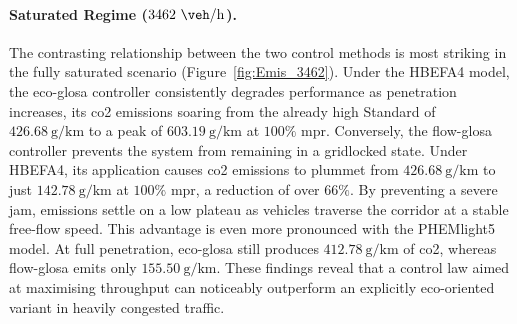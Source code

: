 \paragraph{Saturated Regime ($3462~\unit{\veh\per\hour}$).}
The contrasting relationship between the two control methods is most striking in the fully saturated scenario (Figure~\ref{fig:Emis_3462}). Under the HBEFA4 model, the \ac{eco-glosa} controller consistently degrades performance as penetration increases, its \ac{co2} emissions soaring from the already high Standard of $426.68~\unit{\gram\per\kilo\metre}$ to a peak of $603.19~\unit{\gram\per\kilo\metre}$ at $100\%$ \ac{mpr}. Conversely, the \ac{flow-glosa} controller prevents the system from remaining in a gridlocked state. Under HBEFA4, its application causes \ac{co2} emissions to plummet from $426.68~\unit{\gram\per\kilo\metre}$ to just $142.78~\unit{\gram\per\kilo\metre}$ at $100\%$ \ac{mpr}, a reduction of over $66\%$. By preventing a severe jam, emissions settle on a low plateau as vehicles traverse the corridor at a stable free-flow speed. This advantage is even more pronounced with the PHEMlight5 model. At full penetration, \ac{eco-glosa} still produces $412.78~\unit{\gram\per\kilo\metre}$ of \ac{co2}, whereas \ac{flow-glosa} emits only $155.50~\unit{\gram\per\kilo\metre}$. These findings reveal that a control law aimed at maximising throughput can noticeably outperform an explicitly eco-oriented variant in heavily congested traffic.

